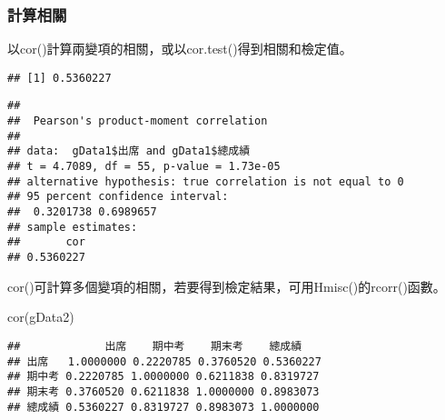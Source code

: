 \documentclass[
]{book}
\newenvironment{Shaded}{\begin{snugshade}}{\end{snugshade}}
\newcommand{\FunctionTok}[1]{\textcolor[rgb]{0.00,0.00,0.00}{#1}}
\newcommand{\NormalTok}[1]{#1}
\newcommand{\SpecialCharTok}[1]{\textcolor[rgb]{0.00,0.00,0.00}{#1}}
\begin{document}
\hypertarget{ux8a08ux7b97ux76f8ux95dc}{%
\subsubsection{計算相關}\label{ux8a08ux7b97ux76f8ux95dc}}

以cor()計算兩變項的相關，或以cor.test()得到相關和檢定值。

\begin{Shaded}
\end{Shaded}

\begin{verbatim}
## [1] 0.5360227
\end{verbatim}

\begin{Shaded}
\end{Shaded}

\begin{verbatim}
## 
##  Pearson's product-moment correlation
## 
## data:  gData1$出席 and gData1$總成績
## t = 4.7089, df = 55, p-value = 1.73e-05
## alternative hypothesis: true correlation is not equal to 0
## 95 percent confidence interval:
##  0.3201738 0.6989657
## sample estimates:
##       cor 
## 0.5360227
\end{verbatim}

cor()可計算多個變項的相關，若要得到檢定結果，可用Hmisc()的rcorr()函數。

\begin{Shaded}
\begin{Highlighting}[]
\FunctionTok{cor}\NormalTok{(gData2)}
\end{Highlighting}
\end{Shaded}

\begin{verbatim}
##             出席    期中考    期末考    總成績
## 出席   1.0000000 0.2220785 0.3760520 0.5360227
## 期中考 0.2220785 1.0000000 0.6211838 0.8319727
## 期末考 0.3760520 0.6211838 1.0000000 0.8983073
## 總成績 0.5360227 0.8319727 0.8983073 1.0000000
\end{verbatim}
\end{document}
